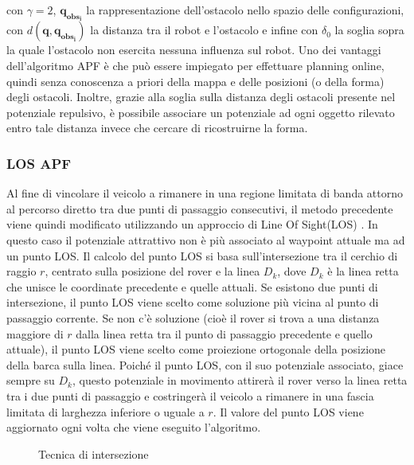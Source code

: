 con $ \gamma = 2$, $ \boldsymbol{q_{obs_i}} $ la rappresentazione dell'ostacolo nello spazio delle configurazioni, con $ d( \boldsymbol{q},  \boldsymbol{q_{obs_i}}) $ la
distanza tra il robot e l'ostacolo e infine con $ \delta_0 $ la soglia sopra la quale l'ostacolo non esercita nessuna influenza sul robot.
Uno dei vantaggi dell'algoritmo APF è che può essere impiegato per effettuare planning online, quindi senza conoscenza a priori della mappa e delle posizioni (o della 
forma) degli ostacoli. Inoltre, grazie alla soglia sulla distanza degli ostacoli presente nel potenziale repulsivo, è possibile associare un potenziale ad ogni oggetto rilevato entro tale distanza invece che cercare di ricostruirne la forma.

\subsubsection{LOS APF}
 Al fine di vincolare il veicolo a rimanere in una regione limitata di banda attorno al percorso diretto tra due punti di passaggio consecutivi, il metodo precedente viene quindi modificato utilizzando un approccio di Line Of Sight(LOS) \cite{LOSAPF}. In questo caso il potenziale attrattivo non è più associato al waypoint attuale ma ad un punto LOS.
Il calcolo del punto LOS si basa sull'intersezione tra il cerchio di raggio $r$, centrato sulla posizione del rover e la linea $D_k$, dove $D_k$ è la linea retta che unisce le coordinate precedente e quelle attuali. Se esistono due punti di intersezione, il punto LOS viene scelto come soluzione più vicina al punto di passaggio corrente. Se non c'è soluzione (cioè il rover si trova a una distanza maggiore di $r$ dalla linea retta tra il punto di passaggio precedente e quello attuale), il punto LOS viene scelto come proiezione ortogonale della posizione della barca sulla linea.
Poiché il punto LOS, con il suo potenziale associato, giace sempre su $D_k$, questo potenziale in movimento attirerà il rover verso la linea retta tra i due punti di passaggio e costringerà il veicolo a rimanere in una fascia limitata di larghezza inferiore o uguale a $r$. 
Il valore del punto LOS viene aggiornato ogni volta che viene eseguito l'algoritmo.
\begin{figure} [H]
    \centering
    
    \caption{Tecnica di intersezione}
    \label{fig:LOS}
\end{figure}

